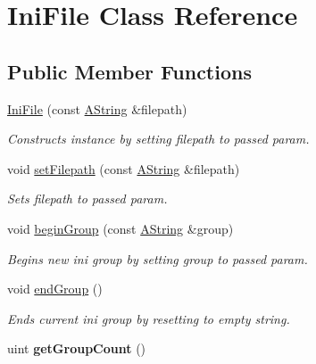 \hypertarget{class_ini_file}{}\section{Ini\+File Class Reference}
\label{class_ini_file}
\subsection*{Public Member Functions}
\begin{DoxyCompactItemize}
\item 
\mbox{\hyperlink{class_ini_file_a5cc166dcb8f8584e3ad4be81efbdbda9}{Ini\+File}} (const \mbox{\hyperlink{class_a_string}{A\+String}} \&filepath)
\begin{DoxyCompactList}\small\item\em Constructs instance by setting filepath to passed param. \end{DoxyCompactList}\item 
void \mbox{\hyperlink{class_ini_file_a3b3caa195a0be5077e8575e259ef7e53}{set\+Filepath}} (const \mbox{\hyperlink{class_a_string}{A\+String}} \&filepath)
\begin{DoxyCompactList}\small\item\em Sets filepath to passed param. \end{DoxyCompactList}\item 
void \mbox{\hyperlink{class_ini_file_a9a34c2bebd5c841500a925e0df6674e9}{begin\+Group}} (const \mbox{\hyperlink{class_a_string}{A\+String}} \&group)
\begin{DoxyCompactList}\small\item\em Begins new ini group by setting group to passed param. \end{DoxyCompactList}\item 
\mbox{\label{class_ini_file_ac01a3e9ffdf50392c12aff7b997bfbbd}} 
void \mbox{\hyperlink{class_ini_file_ac01a3e9ffdf50392c12aff7b997bfbbd}{end\+Group}} ()
\begin{DoxyCompactList}\small\item\em Ends current ini group by resetting to empty string. \end{DoxyCompactList}\item 
\mbox{\label{class_ini_file_a0ce59b29c1e5a6ed6d8f52ed276524c1}} 
uint {\bfseries get\+Group\+Count} ()
\item 
\mbox{\label{class_ini_file_ad7a83aa937129895253cf853726826d6}} 

\end{DoxyCompactItemize}
